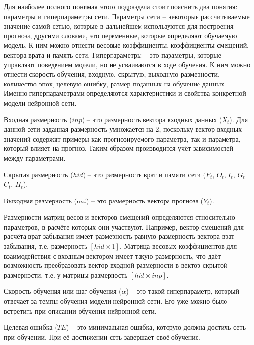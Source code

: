 {\gostFont

  \par \redline Для наиболее полного понимая этого подраздела стоит пояснить два понятия: параметры и гиперпараметры сети. Параметры сети {--} некоторые рассчитываемые значение самой сетью, которые в дальнейшем используются для построения прогноза, другими словами, это переменные, которые определяют обучаемую модель. К ним можно отнести весовые коэффициенты, коэффициенты смещений, вектора врата и память сети. Гиперпараметры {--} это параметры, которые управляют поведением модели, но не усваиваются в ходе обучения. К ним можно отнести скорость обучения, входную, скрытую, выходную размерности, количество эпох, целевую ошибку, размер поданных на обучение данных. Именно гиперпараметрами определяются характеристики и свойства конкретной модели нейронной сети.

  \par \redline Входная размерность ($inp$) {--} это размерность вектора входных данных ($X_t$). Для данной сети заданная размерность умножается на 2, поскольку вектор входных значений содержит примеры как прогнозируемого параметра, так и параметра, который влияет на прогноз. Таким образом производится учёт зависимостей между параметрами.

  \par \redline Скрытая размерность ($hid$) {--} это размерность врат и памяти сети ($F_t$, $O_t$, $I_t$, $G_t$ $C_t$, $H_t$). 

  \par \redline Выходная размерность ($out$) {--} это размерность вектора прогноза ($Y_t$).

  \par \redline Размерности матриц весов и векторов смещений определяются относительно параметров, в расчёте которых они участвуют. Например, вектор смещений для расчёта врат забывания имеет размерность равную размерность вектора врат забывания, т.е. размерность $[hid \times 1]$. Матрица весовых коэффициентов для взаимодействия с входным вектором имеет такую размерность, что даёт возможность преобразовать вектор входной размерности в вектор скрытой размерности, т.е. у матрицы размерность $[hid \times inp]$.

  \par \redline Скорость обучения или шаг обучения ($\alpha$) {--} это такой гиперпараметр, который отвечает за темпы обучения модели нейронной сети. Его уже можно было встретить при описании обучения нейронной сети.

  \par \redline Целевая ошибка ($TE$) {--} это минимальная ошибка, которую должна достичь сеть при обучении. При её достижении сеть завершает своё обучение.

}
